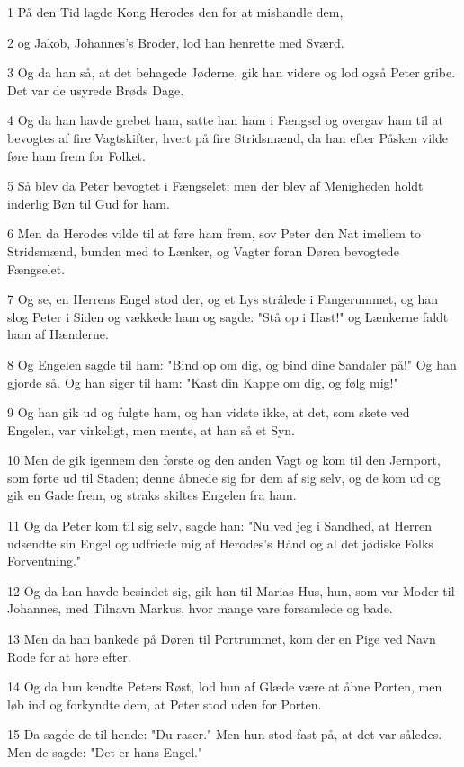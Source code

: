 \par 1 På den Tid lagde Kong Herodes den for at mishandle dem,
\par 2 og Jakob, Johannes's Broder, lod han henrette med Sværd.
\par 3 Og da han så, at det behagede Jøderne, gik han videre og lod også Peter gribe. Det var de usyrede Brøds Dage.
\par 4 Og da han havde grebet ham, satte han ham i Fængsel og overgav ham til at bevogtes af fire Vagtskifter, hvert på fire Stridsmænd, da han efter Påsken vilde føre ham frem for Folket.
\par 5 Så blev da Peter bevogtet i Fængselet; men der blev af Menigheden holdt inderlig Bøn til Gud for ham.
\par 6 Men da Herodes vilde til at føre ham frem, sov Peter den Nat imellem to Stridsmænd, bunden med to Lænker, og Vagter foran Døren bevogtede Fængselet.
\par 7 Og se, en Herrens Engel stod der, og et Lys strålede i Fangerummet, og han slog Peter i Siden og vækkede ham og sagde: "Stå op i Hast!" og Lænkerne faldt ham af Hænderne.
\par 8 Og Engelen sagde til ham: "Bind op om dig, og bind dine Sandaler på!" Og han gjorde så. Og han siger til ham: "Kast din Kappe om dig, og følg mig!"
\par 9 Og han gik ud og fulgte ham, og han vidste ikke, at det, som skete ved Engelen, var virkeligt, men mente, at han så et Syn.
\par 10 Men de gik igennem den første og den anden Vagt og kom til den Jernport, som førte ud til Staden; denne åbnede sig for dem af sig selv, og de kom ud og gik en Gade frem, og straks skiltes Engelen fra ham.
\par 11 Og da Peter kom til sig selv, sagde han: "Nu ved jeg i Sandhed, at Herren udsendte sin Engel og udfriede mig af Herodes's Hånd og al det jødiske Folks Forventning."
\par 12 Og da han havde besindet sig, gik han til Marias Hus, hun, som var Moder til Johannes, med Tilnavn Markus, hvor mange vare forsamlede og bade.
\par 13 Men da han bankede på Døren til Portrummet, kom der en Pige ved Navn Rode for at høre efter.
\par 14 Og da hun kendte Peters Røst, lod hun af Glæde være at åbne Porten, men løb ind og forkyndte dem, at Peter stod uden for Porten.
\par 15 Da sagde de til hende: "Du raser." Men hun stod fast på, at det var således. Men de sagde: "Det er hans Engel."
